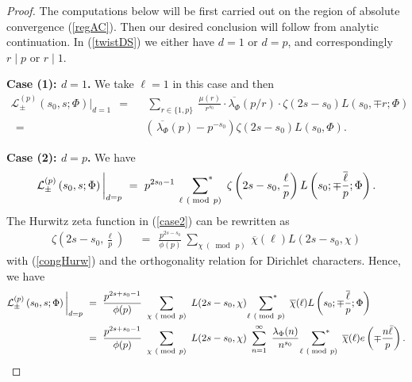 \documentclass[10pt,a4paper]{amsart}
\begin{document}
\begin{proof}
	The computations below will be first  carried out on the region of absolute convergence (\ref{regAC}). Then  our desired conclusion will follow from analytic continuation.  In  (\ref{twistDS})  we either have $d=1$ or $d=p$,  and  correspondingly   $r\mid p$ or $r\mid 1$. 
	
	
	\noindent \textbf{Case (1): $d=1$. }  We take $\ell=1$ in this case and then 
	\begin{align*}
		\mathcal{L}^{(p)}_{\pm}\left(s_{0}, s; \Phi \right) \bigg|_{d=1} \ \ = \ \  	&\ \sum_{r\in \{1,p\}} \ \frac{\mu(r)}{r^{s_{0}}}\cdot   \overline{\lambda_{\Phi}}(p/r) \cdot \zeta(2s-s_{0}) L\left(s_{0}, \mp r; \Phi\right) \nonumber\\
		\ \ =  \ \ &  \left( \,  \overline{\lambda_{\Phi}}(p)- p^{-s_{0}}\right) \zeta(2s-s_{0}) L\left(s_{0}, \Phi\right).
	\end{align*}
	
	
	\noindent \textbf{Case (2): $d=p$.} We have
	\begin{align}\label{case2}
		\mathcal{L}^{(p)}_{\pm}\left(s_{0}, s; \Phi\right) \bigg|_{d=p}  \ = \ 	p^{ 2s_{0}-1}  \  \   \sideset{}{^*}{\sum}_{\ell \ (\bmod\, p)} \  \zeta\left( 2s-s_{0}, \frac{\ell}{p}\right) 	L\left( s_{0}; \mp \frac{\overline{\ell}}{p}; \Phi\right). 
	\end{align}
The Hurwitz zeta function in (\ref{case2})   can be rewritten as  
	\begin{align*}
		\zeta\left( 2s-s_{0}, \frac{\ell}{p}\right) \  \ &=  \ \   \frac{p^{2s-s_{0}}}{\phi(p)} \ \sum_{\chi \ (\bmod\, p)} \ \overline{\chi}(\ell) L(2s-s_{0}, \chi)
	\end{align*}
	 with (\ref{congHurw}) and   the orthogonality relation for Dirichlet characters.  Hence, we have
	\begin{align}\label{afterorth}
			\mathcal{L}^{(p)}_{\pm}\left(s_{0}, s; \Phi\right) \bigg|_{d=p}  \ &= \ 	 \frac{p^{2s+s_{0}-1}}{\phi(p)}  \      \sum_{\chi \ (\bmod\, p)} \  L(2s-s_{0}, \chi)  \  \sideset{}{^*}{\sum}_{\ell \ (\bmod\, p)}  \ \overline{\chi}(\ell) L\left( s_{0}; \mp \frac{\overline{\ell}}{p}; \Phi\right) \nonumber\\
			\ &=\   	 \frac{p^{2s+s_{0}-1}}{\phi(p)}  \      \sum_{\chi \ (\bmod\, p)} \  L(2s-s_{0}, \chi)  \ \sum_{n=1}^{\infty} \ \frac{\lambda_{\Phi}(n)}{n^{s_{0}}} \  \sideset{}{^*}{\sum}_{\ell \ (\bmod\, p)}  \ \overline{\chi}(\ell) 	e\left(\mp \frac{n\bar{\ell}}{p}\right).
	\end{align}
	

\end{proof}
\end{document}
